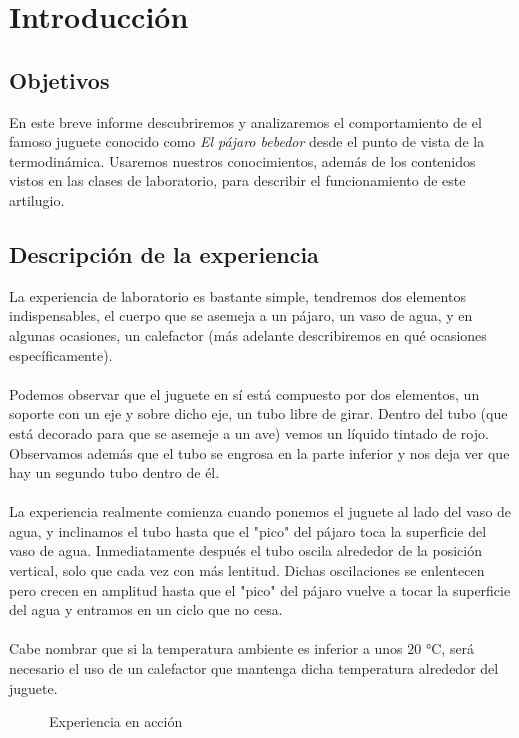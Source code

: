 \section{Introducción}
    \subsection{Objetivos}
        En este breve informe descubriremos y analizaremos el comportamiento de el famoso juguete conocido como \textit{El pájaro bebedor} desde el punto de vista de la termodinámica. Usaremos nuestros conocimientos, además de los contenidos vistos en las clases de laboratorio, para describir el funcionamiento de este artilugio.
    \subsection{Descripción de la experiencia}
        La experiencia de laboratorio es bastante simple, tendremos dos elementos indispensables, el cuerpo que se asemeja a un pájaro, un vaso de agua, y en algunas ocasiones, un calefactor (más adelante describiremos en qué ocasiones específicamente).\\ \\Podemos observar que el juguete en sí está compuesto por dos elementos, un soporte con un eje y sobre dicho eje, un tubo libre de girar. Dentro del tubo (que está decorado para que se asemeje a un ave) vemos un líquido tintado de rojo. Observamos además que el tubo se engrosa en la parte inferior y nos deja ver que hay un segundo tubo dentro de él.\\ \\La experiencia realmente comienza cuando ponemos el juguete al lado del vaso de agua, y inclinamos el tubo hasta que el "pico" del pájaro toca la superficie del vaso de agua. Inmediatamente después el tubo oscila alrededor de la posición vertical, solo que cada vez con más lentitud. Dichas oscilaciones se enlentecen pero crecen en amplitud hasta que el "pico" del pájaro vuelve a tocar la superficie del agua y entramos en un ciclo que no cesa.\\ \\Cabe nombrar que si la temperatura ambiente es inferior a unos $20$ $\si{\celsius}$, será necesario el uso de un calefactor que mantenga dicha temperatura alrededor del juguete.\\
        \begin{figure}[h]\label{fig:horizontal}
            \centering
            \caption{Experiencia en acción}
        \end{figure}
\clearpage
